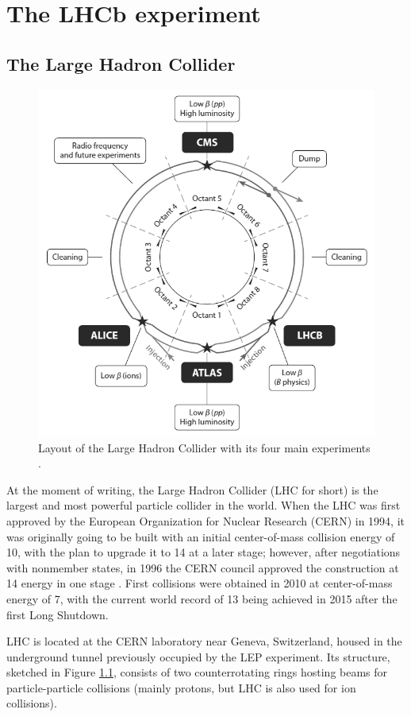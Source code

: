 \chapter{The LHCb experiment}
\label{cap:LHCb}

\section{The Large Hadron Collider}

\begin{figure}[t]
	\centering
	\includegraphics[width=.6\textwidth]{graphics/02-lhcb/lhc_diagram.png}
	\caption[LHC schematic layout.]{Layout of the Large Hadron Collider with its four main experiments \cite{doi:10.1146/annurev-nucl-102010-130438}.}
	\label{fig:2:lhc_diagram}
\end{figure}

At the moment of writing, the Large Hadron Collider (LHC for short) is the largest and most powerful particle collider in the world.
When the LHC was first approved by the European Organization for Nuclear Research (CERN) in 1994, it was originally going to be built with an initial center-of-mass collision energy of \SI{10}{\tev}, with the plan to upgrade it to \SI{14}{\tev} at a later stage;
however, after negotiations with nonmember states, in 1996 the CERN council approved the construction at \SI{14}{\tev} energy in one stage \cite{doi:10.1146/annurev-nucl-102010-130438}.
First collisions were obtained in 2010 at center-of-mass energy of \SI{7}{\tev}, with the current world record of \SI{13}{\tev} being achieved in 2015 after the first Long Shutdown.

LHC is located at the CERN laboratory near Geneva, Switzerland, housed in the underground tunnel previously occupied by the LEP experiment.
Its structure, sketched in Figure \ref{fig:2:lhc_diagram}, consists of two counterrotating rings hosting beams for particle-particle collisions (mainly protons, but LHC is also used for ion collisions).

